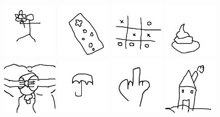 \includegraphics[width=0.2\textwidth]{art/Safari_67.png}
\includegraphics[width=0.2\textwidth]{art/Safari_68.png}
\includegraphics[width=0.2\textwidth]{art/Safari_69.png}
\includegraphics[width=0.2\textwidth]{art/Safari_7.png}
\includegraphics[width=0.2\textwidth]{art/Safari_70.png}
\includegraphics[width=0.2\textwidth]{art/Safari_71.png}
\includegraphics[width=0.2\textwidth]{art/Safari_72.png}
\includegraphics[width=0.2\textwidth]{art/Safari_73.png}
